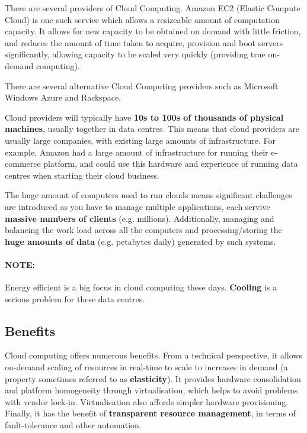 \documentclass{article}
\begin{document}
There are several providers of Cloud Computing. Amazon EC2 (Elastic Compute Cloud) is one such service which allows a resizeable amount of computation capacity. It allows for new capacity to be obtained on demand with little friction, and reduces the amount of time taken to acquire, provision and boot servers significantly, allowing capacity to be scaled very quickly (providing true on-demand computing). 

There are several alternative Cloud Computing providers such as Microsoft Windows Azure and Rackspace. 

Cloud providers will typically have \textbf{10s to 100s of thousands of physical machines}, usually together in data centres. This means that cloud providers are usually large companies, with existing large amounts of infrastructure. For example, Amazon had a large amount of infrastructure for running their e-commerce platform, and could use this hardware and experience of running data centres when starting their cloud business.

The huge amount of computers used to run clouds means significant challenges are introduced as you have to manage multiple applications, each servive \textbf{massive numbers of clients} (e.g. millions). Additionally, managing and balancing the work load across all the computers and processing/storing the \textbf{huge amounts of data} (e.g. petabytes daily) generated by such systems.

\paragraph{\textbf{NOTE: }} Energy efficient is a big focus in cloud computing these days. \textbf{Cooling} is a serious problem for these data centres.

\subsection{Benefits}

Cloud computing offers numerous benefits. From a technical perspective, it allows on-demand scaling of resources in real-time to scale to increases in demand (a property sometimes referred to as \textbf{elasticity}). It provides hardware consolidation and platform homogeneity through virtualisation, which helps to avoid problems with vendor lock-in. Virtualisation also affords simpler hardware provisioning. Finally, it has the benefit of \textbf{transparent resource management}, in terms of fault-tolerance and other automation.
\end{document}
